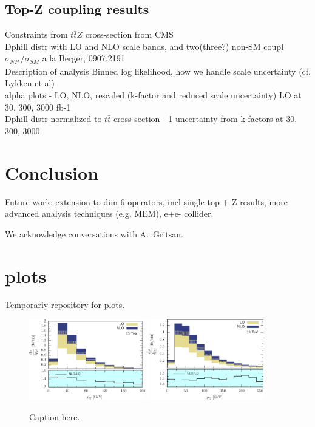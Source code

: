 \documentclass[preprint]{JHEP3} %
\begin{document}
\subsection{Top-Z coupling results}
Constraints from $t\bar{t}Z$ cross-section from CMS \\
Dphill distr with LO and NLO scale bands, and two(three?) non-SM coupl\\
$\sigma_{NP|} / \sigma_{SM}$ a la Berger, 0907.2191 \\
Description of analysis Binned log likelihood, how we handle scale uncertainty (cf. Lykken et al) \\
alpha plots - LO, NLO, rescaled (k-factor and reduced scale uncertainty) LO at 30, 300, 3000 fb-1\\
Dphill distr normalized to $t\bar{t}$ cross-section  - 1 uncertainty from k-factors at 30, 300, 3000\\

\section{Conclusion}
Future work: extension to dim 6 operators, incl single top + Z results, more advanced analysis techniques (e.g. MEM), e+e- collider.
%


\acknowledgments
We acknowledge conversations with A.~Gritsan.



\appendix
\section{plots}
Temporariy repository for plots.


\begin{figure}[h]
\centering %
\includegraphics[width=0.45\textwidth]{./LHC_53_Fig01.eps}
\hfill
\includegraphics[width=0.45\textwidth]{./LHC_53_Fig03.eps}
\caption{\label{fig:i} Caption here.}
\end{figure}
\end{document}
